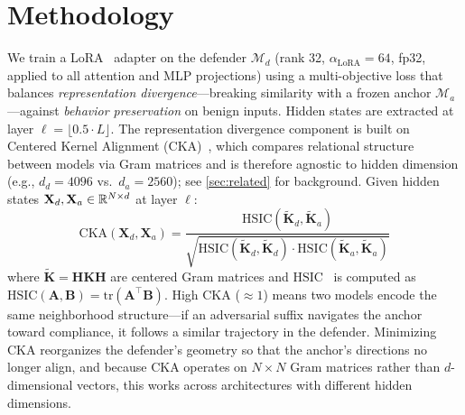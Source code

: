 \section{Methodology}

We train a LoRA~\citep{lora} adapter on the defender $\mathcal{M}_d$ (rank 32, $\alpha_{\text{LoRA}}=64$, fp32, applied to all attention and MLP projections) using a multi-objective loss that balances \emph{representation divergence}---breaking similarity with a frozen anchor $\mathcal{M}_a$---against \emph{behavior preservation} on benign inputs. Hidden states are extracted at layer $\ell = \lfloor 0.5 \cdot L \rfloor$. The representation divergence component is built on Centered Kernel Alignment (CKA)~\citep{kornblith2019similarity}, which compares relational structure between models via Gram matrices and is therefore agnostic to hidden dimension (e.g., $d_d = 4096$ vs.\ $d_a = 2560$); see \cref{sec:related} for background. Given hidden states $\mathbf{X}_d, \mathbf{X}_a \in \mathbb{R}^{N \times d}$ at layer $\ell$:
\begin{equation}
    \text{CKA}(\mathbf{X}_d, \mathbf{X}_a) = \frac{\text{HSIC}(\tilde{\mathbf{K}}_d, \tilde{\mathbf{K}}_a)}{\sqrt{\text{HSIC}(\tilde{\mathbf{K}}_d, \tilde{\mathbf{K}}_d) \cdot \text{HSIC}(\tilde{\mathbf{K}}_a, \tilde{\mathbf{K}}_a)}}
\end{equation}
where $\tilde{\mathbf{K}} = \mathbf{H}\mathbf{K}\mathbf{H}$ are centered Gram matrices and $\text{HSIC}$~\citep{gretton2005hsic} is computed as $\text{HSIC}(\mathbf{A},\mathbf{B}) = \text{tr}(\mathbf{A}^\top\mathbf{B})$.
High CKA ($\approx 1$) means two models encode the same neighborhood structure---if an adversarial suffix navigates the anchor toward compliance, it follows a similar trajectory in the defender. Minimizing CKA reorganizes the defender's geometry so that the anchor's directions no longer align, and because CKA operates on $N \times N$ Gram matrices rather than $d$-dimensional vectors, this works across architectures with different hidden dimensions.

